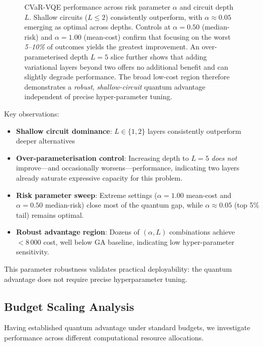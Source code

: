 \begin{figure}[htb]
    \centering
    \caption{CVaR-VQE performance across risk parameter $\alpha$ and circuit depth $L$. Shallow circuits ($L \leq 2$) consistently outperform, with $\alpha \approx 0.05$ emerging as optimal across depths. Controls at $\alpha = 0.50$ (median-risk) and $\alpha = 1.00$ (mean-cost) confirm that focusing on the worst \emph{5--10\%} of outcomes yields the greatest improvement. An over-parameterised depth $L = 5$ slice further shows that adding variational layers beyond two offers no additional benefit and can slightly degrade performance. The broad low-cost region therefore demonstrates a \emph{robust}, \emph{shallow-circuit} quantum advantage independent of precise hyper-parameter tuning.}
    \label{fig:vqe_heatmap}
\end{figure}

Key observations:
\begin{itemize}[nosep]
    \item \textbf{Shallow circuit dominance}: $L \in \{1, 2\}$ layers consistently outperform deeper alternatives
    \item \textbf{Over-parameterisation control}: Increasing depth to $L = 5$ \emph{does not} improve---and occasionally worsens---performance, indicating two layers already saturate expressive capacity for this problem.
    \item \textbf{Risk parameter sweep}: Extreme settings ($\alpha = 1.00$ mean-cost and $\alpha = 0.50$ median-risk) close most of the quantum gap, while $\alpha \approx 0.05$ (top 5\% tail) remains optimal.
    \item \textbf{Robust advantage region}: Dozens of $(\alpha, L)$ combinations achieve $<8\,000$ cost, well below GA baseline, indicating low hyper-parameter sensitivity.
\end{itemize}

This parameter robustness validates practical deployability: the quantum advantage does not require precise hyperparameter tuning.

\subsection{Budget Scaling Analysis}

Having established quantum advantage under standard budgets, we investigate performance across different computational resource allocations.

